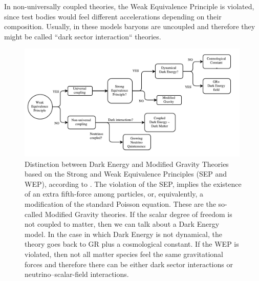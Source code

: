 In non-universally coupled theories, the Weak Equivalence Principle is violated,
since test bodies would feel different accelerations depending on
their composition. Usually, in these models baryons are uncoupled and therefore they might be called ``dark sector interaction`` theories.

\begin{figure}[H]

\begin{center}
\includegraphics[width=0.99\textwidth]
{Figures/DE-MG.pdf}
\end{center}
\caption[Dark Energy - Modified Gravity Flowchart]{Distinction between Dark Energy and
Modified Gravity Theories based on the Strong and Weak Equivalence Principles (SEP and WEP), according to \cite{Joyce, Lombrisier}.
The violation of the SEP, implies the existence of an extra fifth-force among particles, 
or, equivalently, a modification of the standard Poisson equation. These are the so-called Modified Gravity theories.
If the scalar degree of freedom is not coupled to matter, then we can talk about a Dark Energy model.
In the case in which Dark Energy is not dynamical, the theory goes back to GR plus a cosmological constant.
If the WEP is violated, then not all matter species feel the same gravitational forces and therefore
there can be either dark sector interactions or neutrino--scalar-field interactions.
}\label{fig:DE-vs-MG-WEP-SEP}
\end{figure}

